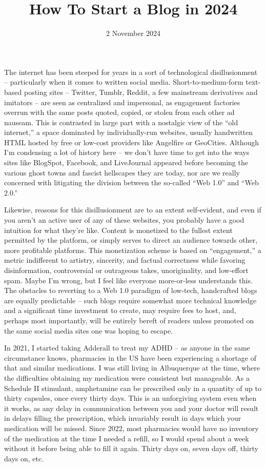 \documentclass[11pt]{article}
\title{How To Start a Blog in 2024}
\date{2 November 2024}
\newcommand{\BExcerpt}{}
\newcommand{\EExcerpt}{}
\begin{document}
    \maketitle

    \BExcerpt
    The internet has been steeped for years in a sort of technological disillusionment -- particularly when it comes to written social media. Short-to-medium-form text-based posting sites -- Twitter, Tumblr, Reddit, a few mainstream derivatives and imitators -- are seen as centralized and impersonal, as engagement factories overrun with the same posts quoted, copied, or stolen from each other ad nauseam. This is contrasted in large part with a nostalgic view of the ``old internet,'' a space dominated by individually-run websites, usually handwritten HTML hosted by free or low-cost providers like Angelfire or GeoCities. Although I'm condensing a lot of history here -- we don't have time to get into the ways sites like BlogSpot, Facebook, and LiveJournal appeared before becoming the various ghost towns and fascist hellscapes they are today, nor are we really concerned with litigating the division between the so-called ``Web 1.0'' and ``Web 2.0.'' 
    \EExcerpt

    Likewise, reasons for this disillusionment are to an extent self-evident, and even if you aren't an active user of any of these websites, you probably have a good intuition for what they're like. Content is monetized to the fullest extent permitted by the platform, or simply serves to direct an audience towards other, more profitable platforms. This monetization scheme is based on ``engagement,'' a metric indifferent to artistry, sincerity, and factual correctness while favoring disinformation, controversial or outrageous takes, unoriginality, and low-effort spam. Maybe I'm wrong, but I feel like everyone more-or-less understands this. The obstacles to reverting to a Web 1.0 paradigm of low-tech, handcrafted blogs are equally predictable -- such blogs require somewhat more technical knowledge and a significant time investment to create, may require fees to host, and, perhaps most importantly, will be entirely bereft of readers unless promoted on the same social media sites one was hoping to escape. 

    In 2021, I started taking Adderall to treat my ADHD -- as anyone in the same circumstance knows, pharmacies in the US have been experiencing a shortage of that and similar medications. I was still living in Albuquerque at the time, where the difficulties obtaining my medication were consistent but manageable. As a Schedule II stimulant, amphetamine can be prescribed only in a quantity of up to thirty capsules, once every thirty days. This is an unforgiving system even when it works, as any delay in communication between you and your doctor will result in delays filling the prescription, which invariably result in days which your medication will be missed. Since 2022, most pharmacies would have no inventory of the medication at the time I needed a refill, so I would spend about a week without it before being able to fill it again. Thirty days on, seven days off, thirty days on, etc.
\end{document}
